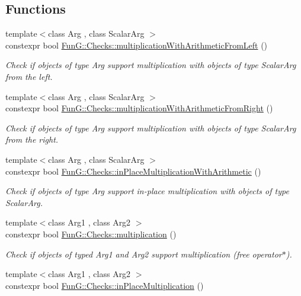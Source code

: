 \subsection*{Functions}
\begin{DoxyCompactItemize}
\item 
{\footnotesize template$<$class Arg , class Scalar\+Arg $>$ }\\constexpr bool \hyperlink{namespaceFunG_1_1Checks_a023e0071a13fe19a14bd71df1a02a290}{Fun\+G\+::\+Checks\+::multiplication\+With\+Arithmetic\+From\+Left} ()
\begin{DoxyCompactList}\small\item\em Check if objects of type Arg support multiplication with objects of type Scalar\+Arg from the left. \end{DoxyCompactList}\item 
{\footnotesize template$<$class Arg , class Scalar\+Arg $>$ }\\constexpr bool \hyperlink{namespaceFunG_1_1Checks_a584f795b6dfaffd9657888893afd32f3}{Fun\+G\+::\+Checks\+::multiplication\+With\+Arithmetic\+From\+Right} ()
\begin{DoxyCompactList}\small\item\em Check if objects of type Arg support multiplication with objects of type Scalar\+Arg from the right. \end{DoxyCompactList}\item 
{\footnotesize template$<$class Arg , class Scalar\+Arg $>$ }\\constexpr bool \hyperlink{namespaceFunG_1_1Checks_a3b91969c5e1b84915c384cee63bdb649}{Fun\+G\+::\+Checks\+::in\+Place\+Multiplication\+With\+Arithmetic} ()
\begin{DoxyCompactList}\small\item\em Check if objects of type Arg support in-\/place multiplication with objects of type Scalar\+Arg. \end{DoxyCompactList}\item 
{\footnotesize template$<$class Arg1 , class Arg2 $>$ }\\constexpr bool \hyperlink{namespaceFunG_1_1Checks_afc0d2ac0287022a297061359d40073d2}{Fun\+G\+::\+Checks\+::multiplication} ()
\begin{DoxyCompactList}\small\item\em Check if objects of typed Arg1 and Arg2 support multiplication (free operator$\ast$). \end{DoxyCompactList}\item 
{\footnotesize template$<$class Arg1 , class Arg2 $>$ }\\constexpr bool \hyperlink{namespaceFunG_1_1Checks_abeeb72e6dc640672187145a0469da9cc}{Fun\+G\+::\+Checks\+::in\+Place\+Multiplication} ()

\end{DoxyCompactItemize}

